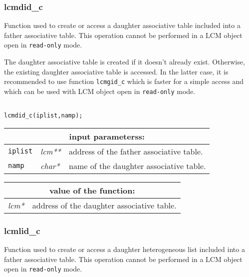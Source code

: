\subsubsection{lcmdid\_c}

Function used to create or access a daughter associative table included into a father associative table. This operation cannot be
performed in a LCM object open in {\tt read-only} mode.

\vskip 0.2cm

The daughter associative table is created if it doesn't already exist. Otherwise, the
existing daughter associative table is accessed. In the latter case, it is recommended
to use function {\tt lcmgid\_c} which is faster for a simple access and which can be used
with LCM object open in {\tt read-only} mode.

\begin{verbatim}

lcmdid_c(iplist,namp);
\end{verbatim}

\vskip 0.5cm

\noindent
\begin{tabular}{|p{1.5cm}|p{2cm}|p{11cm}|}
\hline
\multicolumn{3}{|c|}{\bf input parameterss:} \\
\hline
{\tt iplist} & {\it lcm**} & address of the father associative table. \\
\hline
{\tt namp} & {\it char*} & name of the daughter associative table. \\
\hline
\end{tabular}

\vskip 0.4cm

\noindent
\begin{tabular}{|p{4.0cm}|p{11cm}|}
\hline
\multicolumn{2}{|c|}{\bf value of the function:} \\
\hline
{\it lcm*} & address of the daughter associative table. \\
\hline
\end{tabular}

\subsubsection{lcmlid\_c}

Function used to create or access a daughter heterogeneous list included into a father associative table. This operation cannot be
performed in a LCM object open in {\tt read-only} mode.

\vskip 0.2cm

